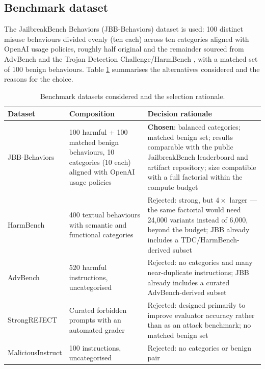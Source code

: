 \documentclass[a4paper,12pt]{article}
\begin{document}
\subsection{Benchmark dataset}

The JailbreakBench Behaviors (JBB-Behaviors) dataset \cite{chao2024jbb} is used: 100
distinct misuse behaviours divided evenly (ten each) across ten categories aligned
with OpenAI usage policies, roughly half original and the remainder sourced from
AdvBench \cite{zou2023universal} and the Trojan Detection Challenge/HarmBench
\cite{mazeika2024harmbench}, with a matched set of 100 benign behaviours. Table
\ref{tab:datasets} summarises the alternatives considered and the reasons for the
choice.

\begin{table}[htbp]
\centering
\small
\begin{tabular}{p{3.0cm}p{4.4cm}p{6.8cm}}
\toprule
Dataset & Composition & Decision rationale \\
\midrule
JBB-Behaviors \cite{chao2024jbb} & 100 harmful + 100 matched benign behaviours,
10 categories (10 each) aligned with OpenAI usage policies &
\textbf{Chosen}: balanced categories; matched benign set; results comparable
with the public JailbreakBench leaderboard and artifact repository; size
compatible with a full factorial within the compute budget \\
HarmBench \cite{mazeika2024harmbench} & 400 textual behaviours with semantic
and functional categories & Rejected: strong, but $4\times$ larger --- the same
factorial would need 24{,}000 variants instead of 6{,}000, beyond the budget;
JBB already includes a TDC/HarmBench-derived subset \\
AdvBench \cite{zou2023universal} & 520 harmful instructions, uncategorised &
Rejected: no categories and many near-duplicate instructions; JBB already
includes a curated AdvBench-derived subset \\
StrongREJECT \cite{souly2024strongreject} & Curated forbidden prompts with an
automated grader & Rejected: designed primarily to improve evaluator accuracy
rather than as an attack benchmark; no matched benign set \\
MaliciousInstruct \cite{huang2023malicious} & 100 instructions, uncategorised
& Rejected: no categories or benign pair \\
\bottomrule
\end{tabular}
\caption{Benchmark datasets considered and the selection rationale.}
\label{tab:datasets}
\end{table}
\end{document}
